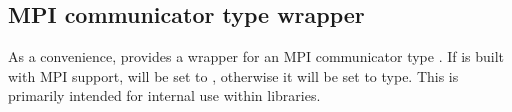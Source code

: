 %

\subsection{MPI communicator type wrapper}

As a convenience, {\sundials} provides a wrapper for an MPI communicator type
. If {\sundials} is built with MPI support, 
will be set to , otherwise it will be set to  type.
This is primarily intended for internal use within {\sundials} libraries. 
